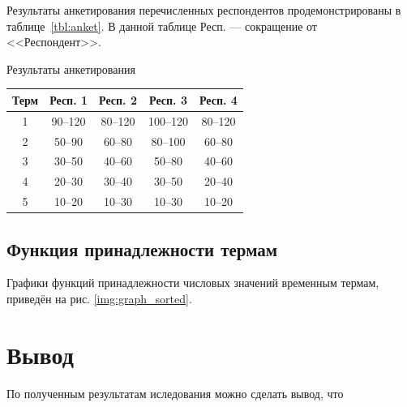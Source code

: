 Результаты анкетирования перечисленных респондентов продемонстрированы в таблице~\ref{tbl:anket}. В данной таблице Респ. --- сокращение от <<Респондент>>.

\begin{center}
	\begin{threeparttable}
			\caption{Результаты анкетирования}
		\label{tbl:anket}
	\begin{tabular}{|c|c|c|c|c|}\hline
		Терм & Респ. 1 & Респ. 2 & Респ. 3  & Респ. 4 \\ \hline
		1 & 90--120  &80--120  & 100--120 & 80--120\\ \hline 
		2 & 50--90  &  60--80  & 80--100& 60--80\\ \hline
		3&  30--50  & 40--60   &50--80 &  40--60 \\ \hline
		4 &  20--30 & 30--40  & 30--50 & 20--40 \\ \hline
		5 & 10--20    & 10--30 &10--30 &10--20  \\ \hline
\end{tabular}	
\end{threeparttable}
\end{center}

\subsection{Функция принадлежности термам}

Графики функций принадлежности числовых значений временным термам, приведён на рис. \ref{img:graph_sorted}.
\begin{center}
	\label{img:graph_sorted}
\end{center}

\section{Вывод}
По полученным результатам иследования можно сделать вывод, что 
